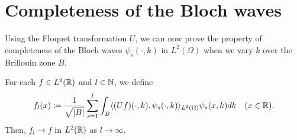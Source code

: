 \section{Completeness of the Bloch waves} \label{sec:5.2}

Using the Floquet transformation $U$, we can now prove the property of completeness of the Bloch waves $\psi_{s}(\cdot, k)$ in $L^{2}(\Omega)$ when we vary $k$ over the Brillouin zone $B$.
	
\begin{theorem} \label{3.3:thm-flConvergence}
		For each $f \in L^{2}(\mathbb{R})$ and $l \in \mathbb{N}$, we define
			\begin{equation}
				f_{l}(x) \coloneqq \frac{1}{\sqrt{|B|}} \sum_{s=1}^{l} \int_{B} \langle (Uf)(\cdot, k), \psi_{s}(\cdot, k) \rangle_{L^{2}(\Omega)} \psi_{s}(x, k) dk \quad (x \in \mathbb{R}). \label{3.15}
			\end{equation}
		Then, $f_{l} \rightarrow f$ in $L^{2}(\mathbb{R})$ as $l \rightarrow \infty$.


\end{theorem}
